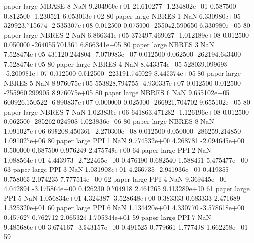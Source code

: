             paper      large    MBASE                 8                  NaN 9.204960e+01     21.610277 -1.234802e+01 0.587500 0.812500      -1.230521 6.053013e+02 80
            paper      large    NBRES                 1                  NaN 6.330980e+05 329923.715674 -2.535307e+08 0.012500 0.075000 -255042.590650 6.330980e+05 80
            paper      large    NBRES                 2                  NaN 6.866341e+05 373497.469027 -1.012189e+08 0.012500 0.050000 -264055.701361 6.866341e+05 80
            paper      large    NBRES                 3                  NaN 7.528474e+05 431120.244804 -7.070983e+07 0.012500 0.062500 -262194.643400 7.528474e+05 80
            paper      large    NBRES                 4                  NaN 8.443374e+05 528039.099698 -5.200981e+07 0.012500 0.012500 -223191.745029 8.443374e+05 80
            paper      large    NBRES                 5                  NaN 8.976075e+05 553828.794755 -4.930337e+07 0.012500 0.012500 -255960.299905 8.976075e+05 80
            paper      large    NBRES                 6                  NaN 9.655102e+05 600926.150522 -6.890837e+07 0.000000 0.025000 -266921.704702 9.655102e+05 80
            paper      large    NBRES                 7                  NaN 1.023836e+06 641863.471282 -1.126196e+08 0.012500 0.062500 -285262.024908 1.023836e+06 80
            paper      large    NBRES                 8                  NaN 1.091027e+06 699208.450361 -2.270300e+08 0.012500 0.050000 -286259.214850 1.091027e+06 80
            paper      large      PPI                 1                  NaN 9.774532e+00      4.268781 -2.094645e+00 0.500000 0.687500       0.976249 2.475749e+00 64
            paper      large      PPI                 2                  NaN 1.088564e+01      4.443973 -2.722465e+00 0.476190 0.682540       1.588461 5.475477e+00 63
            paper      large      PPI                 3                  NaN 1.031908e+01      4.256735 -2.941936e+00 0.419355 0.758065       2.074235 7.777514e+00 62
            paper      large      PPI                 4                  NaN 9.369445e+00      4.042894 -3.175864e+00 0.426230 0.704918       2.461265 9.413289e+00 61
            paper      large      PPI                 5                  NaN 1.056834e+01      4.324387 -3.528648e+00 0.383333 0.683333       2.471689 1.325320e+01 60
            paper      large      PPI                 6                  NaN 1.134420e+01      4.330770 -3.578618e+00 0.457627 0.762712       2.065324 1.705344e+01 59
            paper      large      PPI                 7                  NaN 9.485686e+00      3.674167 -3.543157e+00 0.491525 0.779661       1.777498 1.662258e+01 59
